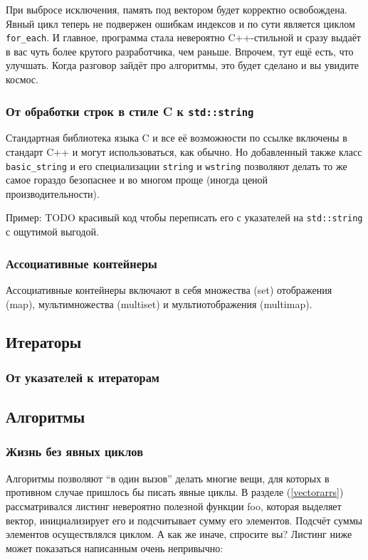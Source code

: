 \documentclass[a4paper,12pt,oneside]{article}
\begin{document}
При выбросе исключения, память под вектором будет корректно освобождена. Явный цикл теперь не подвержен ошибкам индексов и по сути является циклом \lstinline!for_each!. И главное, программа стала невероятно C++-стильной и сразу выдаёт в вас чуть более крутого разработчика, чем раньше. Впрочем, тут ещё есть, что улучшать. Когда разговор зайдёт про алгоритмы, это будет сделано и вы увидите космос.

\subsubsection{От обработки строк в стиле C к \lstinline!std::string!}

Стандартная библиотека языка C и все её возможности по ссылке включены в стандарт C++ и могут использоваться, как обычно. Но добавленный также класс \lstinline!basic_string! и его специализации \lstinline!string! и \lstinline!wstring! позволяют делать то же самое гораздо безопаснее и во многом проще (иногда ценой производительности).

Пример: TODO красивый код чтобы переписать его с указателей на \lstinline!std::string! с ощутимой выгодой.

\subsubsection{Ассоциативные контейнеры}

Ассоциативные контейнеры включают в себя множества (set) отображения (map), мультимножества (multiset) и мультиотображения (multimap).

\subsection{Итераторы}

\subsubsection{От указателей к итераторам}

\subsection{Алгоритмы}

\subsubsection{Жизнь без явных циклов}

Алгоритмы позволяют ``в один вызов'' делать многие вещи, для которых в противном случае пришлось бы писать явные циклы. В разделе (\ref{vectorarrs}) рассматривался листинг невероятно полезной функции foo, которая выделяет вектор, инициализирует его и подсчитывает сумму его элементов. Подсчёт суммы элементов осуществлялся циклом. А как же иначе, спросите вы? Листинг ниже может показаться написанным очень непривычно:
\end{document}
